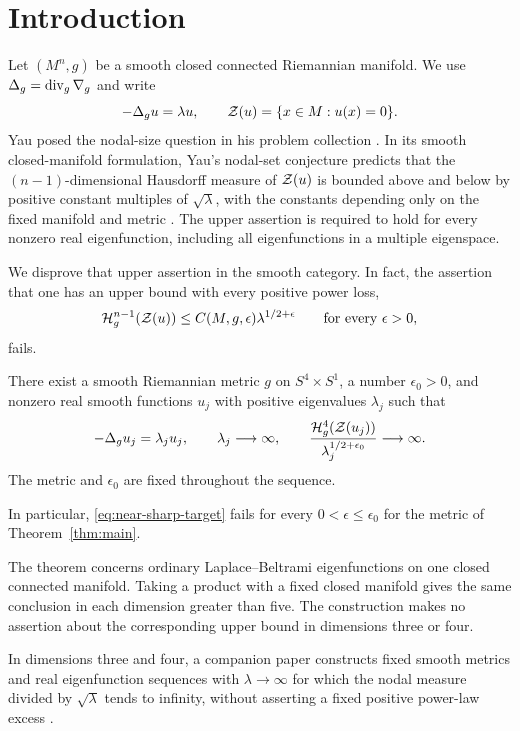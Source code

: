 \section{Introduction}\label{sec:introduction}

Let $(M^n,g)$ be a smooth closed connected Riemannian manifold. We use
$\Delta_g=\operatorname{div}_g\nabla_g$ and write
\[
 -\Delta_g u=\lambda u,\qquad
 \mathcal Z(u)=\{x\in M:u(x)=0\}.
\]
Yau posed the nodal-size question in his problem collection
\cite{Yau1982}. In its smooth closed-manifold formulation, Yau's
nodal-set conjecture predicts that the $(n-1)$-dimensional
Hausdorff measure of $\mathcal Z(u)$ is bounded above and below by positive
constant multiples of $\sqrt\lambda$, with the constants depending only
on the fixed manifold and metric \cite[p.~162]{DonnellyFefferman1988}.
The upper assertion is required to
hold for every nonzero real eigenfunction, including all eigenfunctions
in a multiple eigenspace.

We disprove that upper assertion in the smooth category. In fact, the
assertion that one has an upper bound with every positive power loss,
\begin{equation}\label{eq:near-sharp-target}
 \mathcal H_g^{n-1}(\mathcal Z(u))
 \le C(M,g,\epsilon)\lambda^{1/2+\epsilon}
 \qquad\text{for every }\epsilon>0,
\end{equation}
fails.

\begin{theorem}\label{thm:main}
There exist a smooth Riemannian metric $g$ on $S^4\times S^1$, a number
$\epsilon_0>0$, and nonzero real smooth functions $u_j$ with positive
eigenvalues $\lambda_j$ such that
\[
 -\Delta_g u_j=\lambda_j u_j,\qquad
 \lambda_j\longrightarrow\infty,\qquad
 \frac{\mathcal H_g^4(\mathcal Z(u_j))}
      {\lambda_j^{1/2+\epsilon_0}}\longrightarrow\infty.
\]
The metric and $\epsilon_0$ are fixed throughout the sequence.
\end{theorem}

In particular, \eqref{eq:near-sharp-target} fails for every
$0<\epsilon\le\epsilon_0$ for the metric of Theorem~\ref{thm:main}.

The theorem concerns ordinary Laplace--Beltrami eigenfunctions on one
closed connected manifold. Taking a product with a fixed closed manifold
gives the same conclusion in each dimension greater than five. The
construction makes no assertion about the corresponding upper bound in
dimensions three or four.

In dimensions three and four, a companion paper constructs fixed smooth
metrics and real eigenfunction sequences with $\lambda\to\infty$ for which
the nodal measure divided by $\sqrt\lambda$ tends to infinity, without
asserting a fixed positive power-law excess
\cite[Theorems~1.1 and~1.2]{OpenAINodalQualitative2026}.

